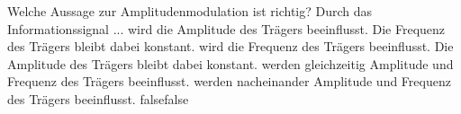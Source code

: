     {Welche Aussage zur Amplitudenmodulation ist richtig? Durch das Informationssignal ...}
    {wird die Amplitude des Trägers beeinflusst. Die Frequenz des Trägers bleibt dabei konstant.}
    {wird die Frequenz des Trägers beeinflusst. Die Amplitude des Trägers bleibt dabei konstant.}
    {werden gleichzeitig Amplitude und Frequenz des Trägers beeinflusst.}
    {werden nacheinander Amplitude und Frequenz des Trägers beeinflusst.}
    {false}{false}